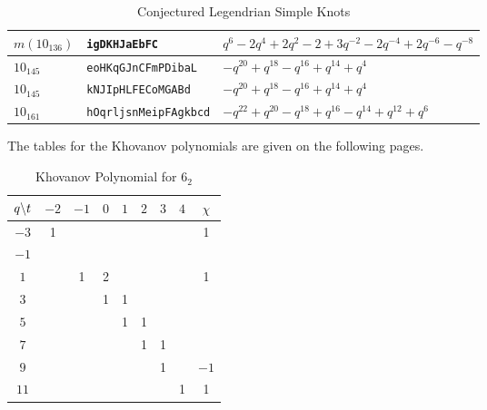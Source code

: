 \begin{table}
{\begin{tabular}{| l | l | l |}
                \hline
                $m(10_{136})$&\texttt{igDKHJaEbFC}&$q^{6}-2q^{4}+2q^{2}-2+3q^{-2}-2q^{-4}+2q^{-6}-q^{-8}$\\
                \hline
                $10_{145}$&\texttt{eoHKqGJnCFmPDibaL}&$-q^{20}+q^{18}-q^{16}+q^{14}+q^{4}$\\
                \hline
                $10_{145}$&\texttt{kNJIpHLFECoMGABd}&$-q^{20}+q^{18}-q^{16}+q^{14}+q^{4}$\\
                \hline
                $10_{161}$&\texttt{hOqrljsnMeipFAgkbcd}&$-q^{22}+q^{20}-q^{18}+q^{16}-q^{14}+q^{12}+q^{6}$\\
                \hline
            \end{tabular}%
        }
        \caption{Conjectured Legendrian Simple Knots}
        \label{fig:conj_leg_simp_knots}
    \end{table}
    The tables for the Khovanov polynomials are given
    on the following pages.
    \begin{table}
        \centering
        \begin{tabular}{| c | c | c | c | c | c | c | c | c |}
            \hline
            $q\symbol{92}t$&$-2$&$-1$&$0$&$1$&$2$&$3$&$4$&$\chi$\\
            \hline
            $-3$&1&&&&&&&1\\
            \hline
            $-1$&&&&&&&&\\
            \hline
            $1$&&1&2&&&&&1\\
            \hline
            $3$&&&1&1&&&&\\
            \hline
            $5$&&&&1&1&&&\\
            \hline
            $7$&&&&&1&1&&\\
            \hline
            $9$&&&&&&1&&$-1$\\
            \hline
            $11$&&&&&&&1&1\\
            \hline
        \end{tabular}
        \caption{Khovanov Polynomial for $6_{2}$}
    \end{table}
